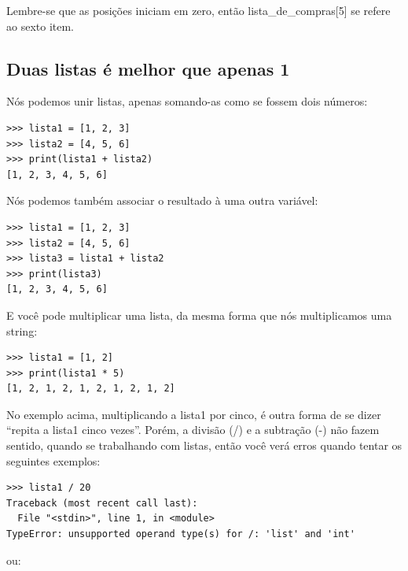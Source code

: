 Lembre-se que as posições iniciam em zero, então lista\_de\_compras[5] se refere ao sexto item.

\subsection*{\color{BrickRed}Duas listas é melhor que apenas 1}

Nós podemos unir listas, apenas somando-as como se fossem dois números:

\begin{listing}
\begin{verbatim}
>>> lista1 = [1, 2, 3]
>>> lista2 = [4, 5, 6]
>>> print(lista1 + lista2)
[1, 2, 3, 4, 5, 6]
\end{verbatim}
\end{listing}

\noindent
Nós podemos também associar o resultado à uma outra variável:

\begin{listing}
\begin{verbatim}
>>> lista1 = [1, 2, 3]
>>> lista2 = [4, 5, 6]
>>> lista3 = lista1 + lista2
>>> print(lista3)
[1, 2, 3, 4, 5, 6]
\end{verbatim}
\end{listing}

\noindent
E você pode multiplicar uma lista, da mesma forma que nós multiplicamos uma string:

\begin{listing}
\begin{verbatim}
>>> lista1 = [1, 2]
>>> print(lista1 * 5)
[1, 2, 1, 2, 1, 2, 1, 2, 1, 2]
\end{verbatim}
\end{listing}

\noindent
No exemplo acima, multiplicando a lista1 por cinco, é outra forma de se dizer ``repita a lista1 cinco vezes''. Porém, a divisão (/) e a subtração (-) não fazem sentido, quando se trabalhando com listas, então você verá erros quando tentar os seguintes exemplos:

\begin{listing}
\begin{verbatim}
>>> lista1 / 20
Traceback (most recent call last):
  File "<stdin>", line 1, in <module>
TypeError: unsupported operand type(s) for /: 'list' and 'int'
\end{verbatim}
\end{listing}

\noindent
ou:

